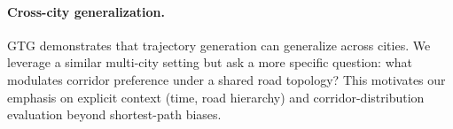 \paragraph{Cross-city generalization.}
GTG \citep{wang2025gtg} demonstrates that trajectory generation can generalize across cities.
We leverage a similar multi-city setting but ask a more specific question: what modulates corridor preference under a shared road topology?
This motivates our emphasis on explicit context (time, road hierarchy) and corridor-distribution evaluation beyond shortest-path biases.
